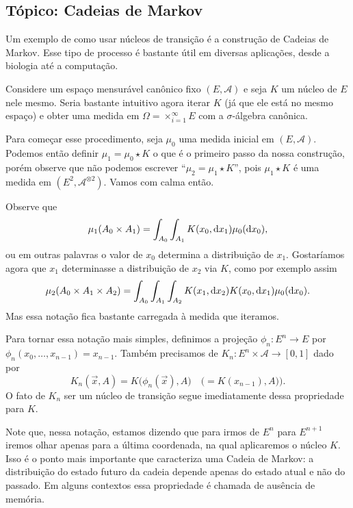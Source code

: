 \begin{topics}

\section{Tópico: Cadeias de Markov}
\label{s:cadeias_Markov}

Um exemplo de como usar núcleos de transição é a construção de Cadeias de Markov.
Esse tipo de processo é bastante útil em diversas aplicações, desde a biologia até a computação.

Considere um espaço mensurável canônico fixo $(E, \mathcal{A})$ e seja $K$ um núcleo de $E$ nele mesmo.
Seria bastante intuitivo agora iterar $K$ (já que ele está no mesmo espaço) e obter uma medida em $\Omega = \times_{i=1}^\infty E$ com a $\sigma$-álgebra canônica.

Para começar esse procedimento, seja $\mu_0$ uma medida inicial em $(E, \mathcal{A})$.
Podemos então definir $\mu_1 = \mu_0 \star K$ o que é o primeiro passo da nossa construção, porém observe que não podemos escrever ``$\mu_2 = \mu_1 \star K$'', pois $\mu_1 \star K$ é uma medida em $(E^2, \mathcal{A}^{\otimes 2})$.
Vamos com calma então.

Observe que
\begin{equation}
  \mu_1(A_0 \times A_1) = \int_{A_0} \int_{A_1} K(x_0, \mathop{}\!\mathrm{d} x_1) \mu_0(\mathop{}\!\mathrm{d} x_0),
\end{equation}
ou em outras palavras o valor de $x_0$ determina a distribuição de $x_1$.
Gostaríamos agora que $x_1$ determinasse a distribuição de $x_2$ via $K$, como por exemplo assim
\begin{equation}
  \mu_2(A_0 \times A_1 \times A_2) = \int_{A_0} \int_{A_1} \int_{A_2} K(x_1, \mathop{}\!\mathrm{d} x_2) K(x_0, \mathop{}\!\mathrm{d} x_1) \mu_0 (\mathop{}\!\mathrm{d} x_0).
\end{equation}
Mas essa notação fica bastante carregada à medida que iteramos.

Para tornar essa notação mais simples, definimos a projeção $\phi_n:E^n \to E$ por $\phi_n(x_0, \dots, x_{n-1}) = x_{n-1}$.
Também precisamos de $K_n: E^n \times \mathcal{A} \to [0,1]$ dado por
\begin{equation}
  K_n(\vec{x},A) = K\big(\phi_n(\vec{x}), A\big) \quad \big(= K(x_{n-1}),A) \big).
\end{equation}
O fato de $K_n$ ser um núcleo de transição segue imediatamente dessa propriedade para $K$.

Note que, nessa notação, estamos dizendo que para irmos de $E^n$ para $E^{n+1}$ iremos olhar apenas para a última coordenada, na qual aplicaremos o núcleo $K$.
Isso é o ponto mais importante que caracteriza uma Cadeia de Markov: a distribuição do estado futuro da cadeia depende apenas do estado atual e não do passado.
Em alguns contextos essa propriedade é chamada de ausência de memória.


\end{topics}
